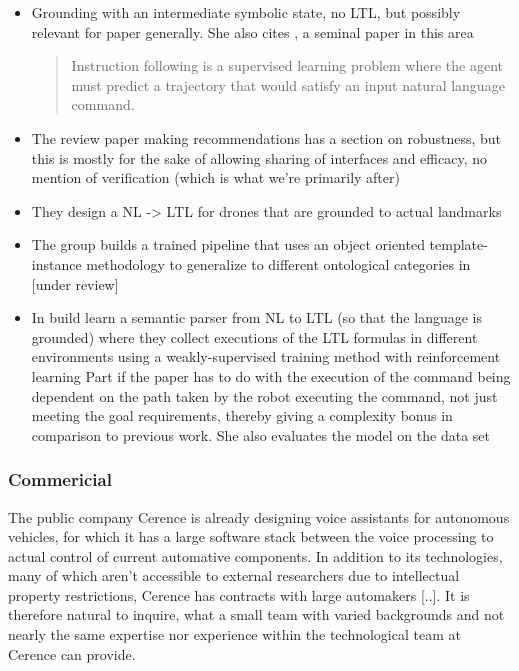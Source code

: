 \documentclass[a4paper, 11pt]{article}
\begin{document}
\begin{itemize}

\item Grounding with an intermediate symbolic state, no LTL, but possibly
  relevant for paper generally. She also cites \cite{walkTalk}, a seminal paper in this area
\begin{quote}
Instruction following is a supervised learning problem
where the agent must predict a trajectory that would satisfy an
input natural language command. \cite{tellexInstr}
\end{quote}
\item The review paper \cite{MARGE2022101255} making recommendations has a
  section on robustness, but this is mostly for the sake of allowing sharing of
  interfaces and efficacy, no mention of verification (which is what we're
  primarily after)
\item They design a NL -> LTL for drones that are grounded to actual landmarks \cite{9197068}
\item The group builds a trained pipeline that uses an object oriented
  template-instance methodology to generalize to different ontological
  categories in  \cite{hsiung2021generalizing} [under review]

\item In \cite{patellearning} build learn a semantic parser from NL to LTL (so
that the language is grounded) where they collect executions of the LTL formulas
in different environments using a weakly-supervised training method with
reinforcement learning Part if the paper has to do with the execution of the
command being dependent on the path taken by the robot executing the command,
not just meeting the goal requirements, thereby giving a complexity bonus in
comparison to previous work. She also evaluates the model on the \cite{walkTalk}
data set
\end{itemize}

\subsubsection{Commericial}

The public company Cerence \cite{} is already designing voice assistants for autonomous
vehicles, for which it has a large software stack between the voice processing
to actual control of current automative components. In addition to its 
technologies, many of which aren't accessible to external researchers due to
intellectual property restrictions, Cerence has contracts with large automakers
[..]. It is therefore natural to inquire, what a small team with varied
backgrounds and not nearly the same expertise nor experience within the
technological team at Cerence can provide.
\end{document}
